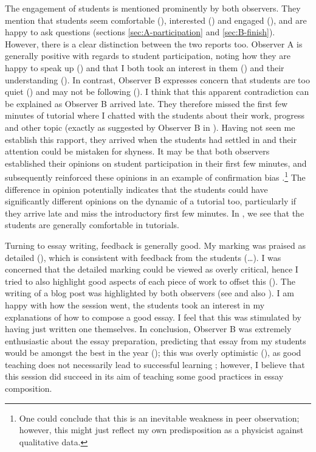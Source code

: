 The engagement of students is mentioned prominently by both observers. They mention that students seem comfortable (), interested () and engaged (), and are happy to ask questions (sections \ref{sec:A-participation} and \ref{sec:B-finish}). However, there is a clear distinction between the two reports too. Observer A is generally positive with regards to student participation, noting how they are happy to speak up () and that I both took an interest in them () and their understanding (). In contrast, Observer B expresses concern that students are too quiet () and may not be following (). I think that this apparent contradiction can be explained as Observer B arrived late. They therefore missed the first few minutes of tutorial where I chatted with the students about their work, progress and other topic (exactly as suggested by Observer B in ). Having not seen me establish this rapport, they arrived when the students had settled in and their attention could be mistaken for shyness. It may be that both observers established their opinions on student participation in their first few minutes, and subsequently reinforced these opinions in an example of confirmation bias \citep{Ross1975,Lord1979}.\footnote{One could conclude that this is an inevitable weakness in peer observation; however, this might just reflect my own predisposition as a physicist against qualitative data.} The difference in opinion potentially indicates that the students could have significantly different opinions on the dynamic of a tutorial too, particularly if they arrive late and miss the introductory first few minutes. In , we see that the students are generally comfortable in tutorials.

Turning to essay writing, feedback is generally good. My marking was praised as detailed (), which is consistent with feedback from the students (\ldots). I was concerned that the detailed marking could be viewed as overly critical, hence I tried to also highlight good aspects of each piece of work to offset this  (). The writing of a blog post was highlighted by both observers (see  and also ). I am happy with how the session went, the students took an interest in my explanations of how to compose a good essay. I feel that this was stimulated by having just written one themselves. In conclusion, Observer B was extremely enthusiastic about the essay preparation, predicting that essay from my students would be amongst the best in the year (); this was overly optimistic (), as good teaching does not necessarily lead to successful learning \citep[chapter 5]{Ramsden1992}; however, I believe that this session did succeed in its aim of teaching some good practices in essay composition.


